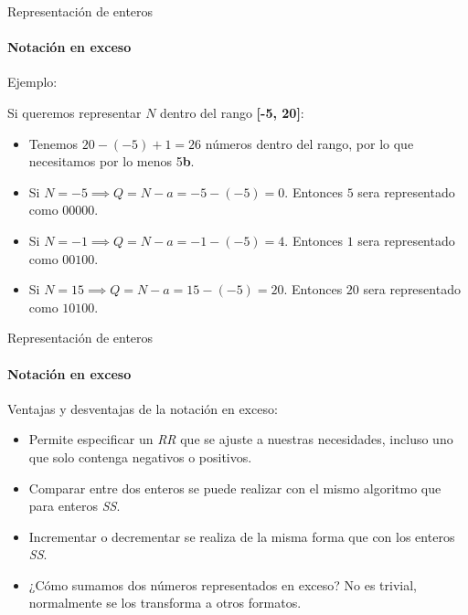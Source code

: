 \documentclass[11pt,a4paper,spanish]{beamer}
\newcommand{\bit}{\textbf{b}}
\begin{document}
\begin{frame}{Representación de enteros}
    \framesubtitle{Notación en exceso}

    Ejemplo:

    Si queremos representar \(N\) dentro del rango \textbf{[-5, 20]}:

    \pause

    \begin{itemize}
        \item Tenemos \(20-(-5)+1=26\) números dentro del rango, por lo que
            necesitamos por lo menos 5\bit{}.\pause
        \item Si \(N=-5 \implies Q = N - a = -5-(-5) = 0\).\pause{} Entonces
            \(5\) sera representado como \(00000\).\pause
        \item Si \(N=-1 \implies Q = N - a = -1-(-5) = 4\).\pause{} Entonces
            \(1\) sera representado como \(00100\).\pause
        \item Si \(N=15 \implies Q = N - a = 15-(-5) = 20\).\pause{} Entonces
            \(20\) sera representado como \(10100\).
    \end{itemize}

\end{frame}

\begin{frame}{Representación de enteros}
    \framesubtitle{Notación en exceso}

    Ventajas y desventajas de la notación en exceso: \pause

    \begin{itemize}
        \item Permite especificar un \emph{RR} que se ajuste a nuestras
            necesidades, incluso uno que solo contenga negativos o positivos.
            \pause
        \item Comparar entre dos enteros se puede realizar con el mismo
            algoritmo que para enteros \emph{SS}. \pause
        \item Incrementar o decrementar se realiza de la misma forma que con
            los enteros \emph{SS}. \pause
        \item ¿Cómo sumamos dos números representados en exceso? No es
            trivial, normalmente se los transforma a otros formatos.
    \end{itemize}

\end{frame}
\end{document}
